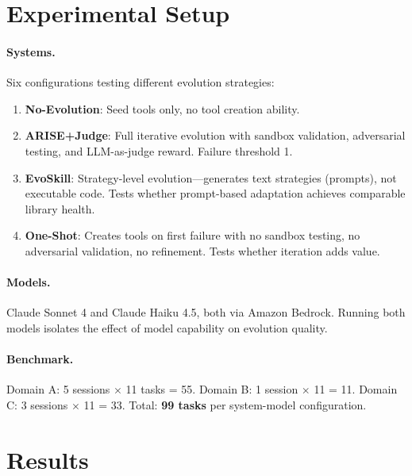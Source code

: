 \documentclass[10pt,twocolumn]{article}
\begin{document}
\section{Experimental Setup}

\paragraph{Systems.} Six configurations testing different evolution strategies:
\begin{enumerate}
\item \textbf{No-Evolution}: Seed tools only, no tool creation ability.
\item \textbf{ARISE+Judge}: Full iterative evolution with sandbox validation, adversarial testing, and LLM-as-judge reward. Failure threshold 1.
\item \textbf{EvoSkill}: Strategy-level evolution---generates text strategies (prompts), not executable code. Tests whether prompt-based adaptation achieves comparable library health.
\item \textbf{One-Shot}: Creates tools on first failure with no sandbox testing, no adversarial validation, no refinement. Tests whether iteration adds value.
\end{enumerate}

\paragraph{Models.} Claude Sonnet 4 and Claude Haiku 4.5, both via Amazon Bedrock. Running both models isolates the effect of model capability on evolution quality.

\paragraph{Benchmark.} Domain A: 5 sessions $\times$ 11 tasks = 55. Domain B: 1 session $\times$ 11 = 11. Domain C: 3 sessions $\times$ 11 = 33. Total: \textbf{99 tasks} per system-model configuration.

\section{Results}
\end{document}

